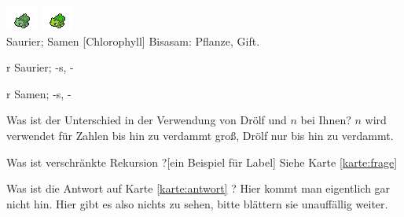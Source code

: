 \documentclass[a9paper,9pt,grid=front%
,toc
]{kartei}
\begin{document}
\setcardpagelayout
\begin{karte}[Notdünger]{
\includegraphics{../regular/bulbasaur}
\includegraphics{../shiny/bulbasaur} \\
Saurier; 
Samen
}[Chlorophyll]
Bisasam: Pflanze, Gift.

r Saurier; -s, -

r Samen; -s, -

\end{karte}

\begin{karte}[Zahlenkunde]{Was ist der Unterschied in der Verwendung von Drölf 
und $n$ bei Ihnen?}
$n$ wird verwendet für Zahlen bis hin zu verdammt groß, Drölf nur bis hin zu 
verdammt.

\end{karte}

\renewcommand{\kommentarstil}{\textsc}

\begin{karte}{Was ist verschränkte Rekursion ?}[ein Beispiel für Label]
\label{karte:antwort} Siehe Karte \ref{karte:frage}
\end{karte}
\begin{karte}{Was ist die Antwort auf Karte \ref{karte:antwort} ?}
\label{karte:frage}
  Hier kommt man eigentlich gar nicht hin. Hier gibt es also nichts zu sehen, 
bitte blättern sie unauffällig weiter.
\end{karte}
\end{document}
